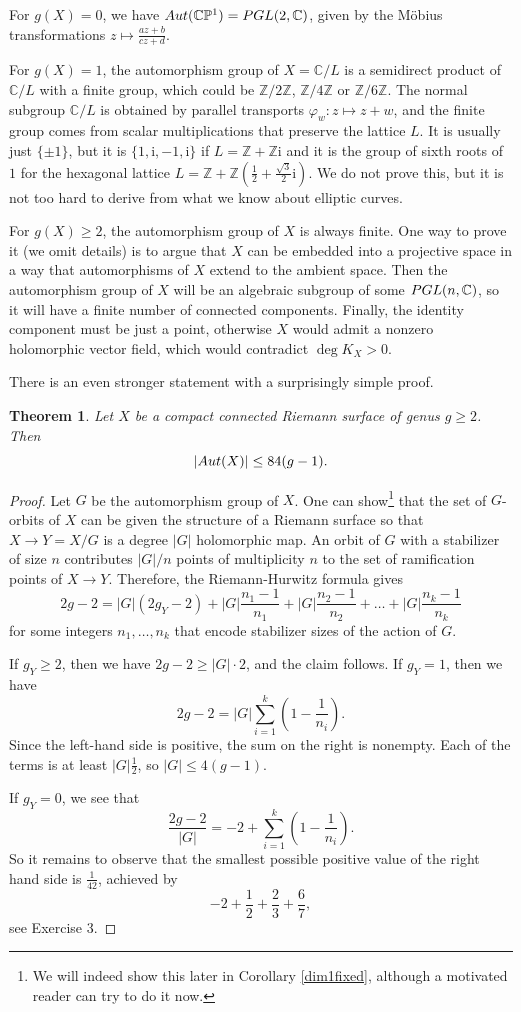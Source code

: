 \documentclass[11pt]{article}
\numberwithin{equation}{section}
\numberwithin{footnote}{section}
\newtheorem{thm}{Theorem}[section]
\newcommand{\ii}{{\mathrm i}}
\renewcommand{\P}{{\mathbb P}}
\newcommand{\Z}{{\mathbb Z}}
\newcommand{\C}{{\mathbb C}}
\begin{document}
\smallskip
For $g(X)=0$, we have ${\rm Aut}(\C\P^1)={\rm PGL}(2,\C)$, given by the M\"obius transformations $z\mapsto \frac {az+b}{cz+d}$.

\smallskip
For $g(X)=1$, the automorphism group of $X=\C/L$ is a semidirect product of $\C/L$ with a finite group, which could be $\Z/2\Z$, $\Z/4\Z$ or $\Z/6\Z$. The normal subgroup $\C/L$ is obtained by parallel transports $\varphi_w:z\mapsto z+w$, and the finite group comes from scalar multiplications that preserve the lattice $L$. It is usually just $\{\pm 1\}$, but it is $\{1,\ii,-1,\ii\}$ if $L=\Z+\Z \ii$ and 
it is the group of sixth roots of $1$ for the hexagonal lattice $L=\Z + \Z(\frac 12 +\frac {\sqrt 3}2\ii)$. We do not prove this, but it is not too hard to derive from what we know about elliptic curves.

\smallskip
For $g(X)\geq 2$, the automorphism group of $X$ is always finite. One way to prove it (we omit details) is to argue that $X$ can be embedded into a projective space in a way that automorphisms of $X$ extend to the ambient space. Then the automorphism group of $X$ will be an algebraic subgroup of some ${\rm PGL}(n,\C)$, so it will have a finite number of connected components. Finally, the identity component must be just a point, otherwise $X$ would admit a nonzero holomorphic vector field, which would contradict $\deg K_X>0$.

\smallskip
There is an even stronger statement with a surprisingly simple proof.
\begin{thm}
Let $X$ be a compact connected Riemann surface of genus $g\geq 2$. Then
$$
\vert {\rm Aut}(X)\vert \leq 84(g-1).
$$
\end{thm}

\begin{proof}
Let $G$ be the automorphism group of $X$. One can show\footnote{ We will indeed show this later in Corollary \ref{dim1fixed}, although a motivated reader can try to do it now.} that the set of $G$-orbits of $X$ can be given the structure of a Riemann surface so that $X\to Y= X/G$ is a degree $\vert G\vert$ holomorphic map.
An orbit of $G$ with a stabilizer of size $n$ contributes $\vert G\vert/n$ points of multiplicity $n$ to the set of ramification points of $X\to Y$. Therefore, the Riemann-Hurwitz formula gives
$$
2g - 2 = |G| (2g_Y-2) + |G|\frac {n_1-1}{n_1} +  |G|\frac {n_2-1}{n_2} + \ldots +  |G|\frac {n_k-1}{n_k} 
$$
for some integers $n_1,\ldots,n_k$ that encode stabilizer sizes of the action of $G$.

\smallskip
If $g_Y\geq 2$, then we have $2g-2 \geq |G| \cdot 2$, and the claim follows. 
If $g_Y=1$, then we have 
$$
2g-2 = |G| \sum_{i=1}^k (1-\frac 1{n_i}).
$$
Since the left-hand side is positive, the sum on the right is nonempty. Each of the terms is at least $|G|\frac 12$, so 
$|G|\leq 4(g-1)$. 

\smallskip
If $g_Y=0$, we see that 
$$
\frac {2g-2}{|G|} = -2 + \sum_{i=1}^k  (1-\frac 1{n_i}).
$$
So it remains to observe that the smallest possible positive value of the right hand side is $\frac 1{42}$, achieved by 
$$-2 + \frac 12 + \frac 23 + \frac 67,$$
see Exercise 3.
\end{proof}
\end{document}
